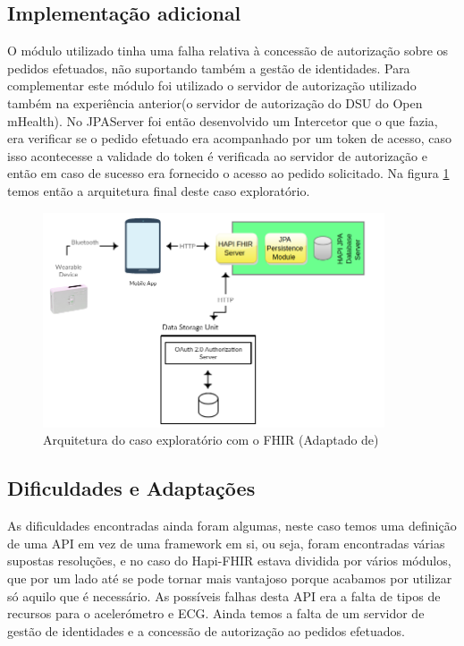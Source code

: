 \subsection{Implementação adicional}
O módulo utilizado tinha uma falha relativa à concessão de autorização sobre os pedidos efetuados, não suportando também a gestão de identidades. Para complementar este módulo foi utilizado o servidor de autorização utilizado também na experiência anterior(o servidor de autorização do \gls{DSU} do Open mHealth).
No JPAServer foi então desenvolvido um Intercetor que o que fazia, era verificar se o pedido efetuado era acompanhado por um token de acesso, caso isso acontecesse a validade do token é verificada ao servidor de autorização e então em caso de sucesso era fornecido o acesso ao pedido solicitado. Na figura \ref{f:exp-fhir-arch} temos então a arquitetura final deste caso exploratório.
\begin{figure}[H]
  \centering
  \includegraphics[width=0.9\textwidth]{imgs/fhir-arch-exp.png}
  \caption[Arquitetura do caso exploratório com o FHIR]{Arquitetura do caso exploratório com o FHIR (Adaptado de)\cite{hapi-index}}
  
  \label{f:exp-fhir-arch}
\end{figure}

\subsection{Dificuldades e Adaptações}
As dificuldades encontradas ainda foram algumas, neste caso temos uma definição de uma \gls{API} em vez de uma framework em si, ou seja, foram encontradas várias supostas resoluções, e no caso do Hapi-FHIR estava dividida por vários módulos, que por um lado até se pode tornar mais vantajoso porque acabamos por utilizar só aquilo que é necessário. As possíveis falhas desta \gls{API} era a falta de tipos de recursos para o acelerómetro e \gls{ECG}. Ainda temos a falta de um servidor de gestão de identidades e a concessão de autorização ao pedidos efetuados.

